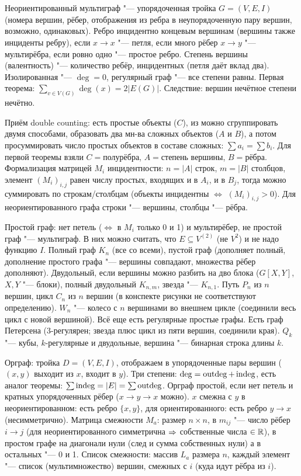 \section{} %
Неориентированный мультиграф "--- упорядоченная тройка $G=(V, E, I)$ (номера вершин, рёбер, отображения из ребра в неупорядоченную пару вершин, возможно, одинаковых).
Ребро инцидентно концевым вершинам (вершины также инциденты ребру), если $x \to x$ "--- петля, если много рёбер $x \to y$ "--- мультирёбра,
если ровно одно "--- простое ребро.
Степень вершины (валентность) "--- количество ребёр, инцидентных (петля даёт вклад два).
Изолированная "--- $\deg = 0$, регулярный граф "--- все степени равны.
Первая теорема: $\sum_{v \in V(G)} \deg(x) = 2|E(G)|$.
Следствие: вершин нечётное степени нечётно.

Приём double counting: есть простые объекты ($C$), из можно сгруппировать двумя способами, образовать два мн-ва сложных объектов ($A$ и $B$),
а потом просуммировать число простых объектов в составе сложных: $\sum a_i = \sum b_i$.
Для первой теоремы взяли $C=\text{полурёбра}$, $A=\text{степень вершины}$, $B=\text{рёбра}$.
Формализация матрицей $M_i$ инцидентности: $n=|A|$ строк, $m=|B|$ столбцов, элемент $(M_i)_{i,j}$
равен числу простых, входящих и в $A_i$, и в $B_j$, тогда можно суммировать по строкам/столбцам
(объекты инцидентны $\iff$ $(M_i)_{i,j}>0$).
Для неориентированного графа строки "--- вершины, столбцы "--- рёбра.

Простой граф: нет петель ($\iff$ в $M_i$ только 0 и 1) и мультирёбер, не простой граф "--- мультиграф.
В них можно считать, что $E \subseteq V^{(2)}$ (не $V^2$) и не надо функцию $I$.
Полный граф $K_n$ (все со всеми), пустой граф (дополняет полный, дополнение простого графа "--- вершины совпадают, множества рёбер дополняют).
Двудольный, если вершины можно разбить на дво блока ($G[X, Y]$, $X, Y$ "--- блоки), полный двудольный $K_{n,m}$, звезда "--- $K_{n,1}$.
Путь $P_n$ из $n$ вершин, цикл $C_n$ из $n$ вершин (\TODO в конспекте рисунки не соответствуют определению).
$W_n$ "--- колесо с $n$ вершинами во внешнем цикле (соединили весь цикл с новой вершиной).
Всё еще есть регулярные простые графы.
Есть граф Петерсена (3-регулярен; звезда плюс цикл из пяти вершин, соединили края).
$Q_k$ "--- кубы, $k$-регулярные и двудольные, вершина "--- бинарная строка длины $k$.

Орграф: тройка $D=(V,E,I)$, отображаем в упорядоченные пары вершин ($(x, y)$ выходит из $x$, входит в $y$). 
Три степени: $\deg = \operatorname{outdeg} + \operatorname{indeg}$, есть аналог теоремы: $\sum \operatorname{indeg} = |E| = \sum \operatorname{outdeg}$.
Орграф простой, если нет петель и кратных упорядоченных рёбер ($x \to y \to x$ можно).
$x$ смежна с $y$ в неориентированном: есть ребро $\{x, y\}$, для ориентированного: есть ребро $y\to x$ (несимметрично).
Матрица смежности $M_a$: размер $n \times n$, в $m_{ij}$ "--- число рёбер $i\to j$ (для неориентированного симметрична $\Rightarrow$
собственные числа $\in \mathbb{R}$), в простом графе на диагонали нули (след и сумма собственных нули) а в остальных "--- 0 и 1.
Список смежности: массив $L_a$ размера $n$, каждый элемент "--- список (мультимножество) вершин, смежных с $i$ (куда идут рёбра из $i$).


